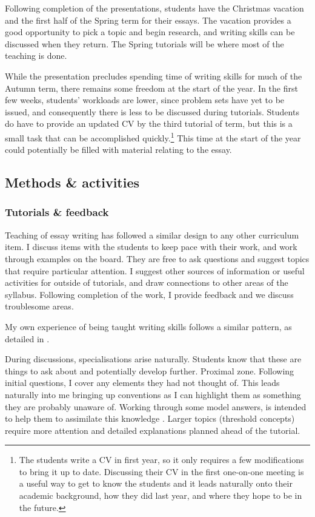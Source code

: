 Following completion of the presentations, students have the Christmas vacation and the first half of the Spring term for their essays. The vacation provides a good opportunity to pick a topic and begin research, and writing skills can be discussed when they return. The Spring tutorials will be where most of the teaching is done.

While the presentation precludes spending time of writing skills for much of the Autumn term, there remains some freedom at the start of the year. In the first few weeks, students' workloads are lower, since problem sets have yet to be issued, and consequently there is less to be discussed during tutorials. Students do have to provide an updated CV by the third tutorial of term, but this is a small task that can be accomplished quickly.\footnote{The students write a CV in first year, so it only requires a few modifications to bring it up to date. Discussing their CV in the first one-on-one meeting is a useful way to get to know the students and it leads naturally onto their academic background, how they did last year, and where they hope to be in the future.} This time at the start of the year could potentially be filled with material relating to the essay.

\subsection{Methods \& activities}\label{sec:essay-methods}

\subsubsection{Tutorials \& feedback}

Teaching of essay writing has followed a similar design to any other curriculum item. I discuss items with the students to keep pace with their work, and work through examples on the board. They are free to ask questions and suggest topics that require particular attention. I suggest other sources of information or useful activities for outside of tutorials, and draw connections to other areas of the syllabus. Following completion of the work, I provide feedback and we discuss troublesome areas.

My own experience of being taught writing skills follows a similar pattern, as detailed in .

During discussions, specialisations arise naturally. Students know that these are things to ask about and potentially develop further. Proximal zone. Following initial questions, I cover any elements they had not thought of. This leads naturally into me bringing up conventions as I can highlight them as something they are probably unaware of. Working through some model answers, is intended to help them to assimilate this knowledge \citep[chapter 10]{Ramsden1992}. Larger topics (threshold concepts) require more attention and detailed explanations planned ahead of the tutorial.

